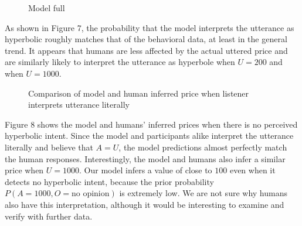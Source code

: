 \documentclass{article} %
\begin{document}
\begin{figure}[tl]
\caption{Model full}
\end{figure}

As shown in Figure 7, the probability that the model interprets the utterance as hyperbolic roughly matches that of the behavioral data, at least in the general trend. It appears that humans are less affected by the actual uttered price and are similarly likely to interpret the utterance as hyperbole when $U = 200$ and when $U = 1000$.

\begin{figure}[tl]
\caption{Comparison of model and human inferred price when listener interprets utterance literally}
\end{figure}

Figure 8 shows the model and humans' inferred prices when there is no perceived hyperbolic intent. Since the model and participants alike interpret the utterance literally and believe that $A = U$, the model predictions almost perfectly match the human responses. Interestingly, the model and humans also infer a similar price when $U = 1000$. Our model infers a value of close to $100$ even when it detects no hyperbolic intent, because the prior probability $P(A = 1000, O = \text{no opinion})$ is extremely low. We are not sure why humans also have this interpretation, although it would  be interesting to examine and verify with further data.
\end{document}
